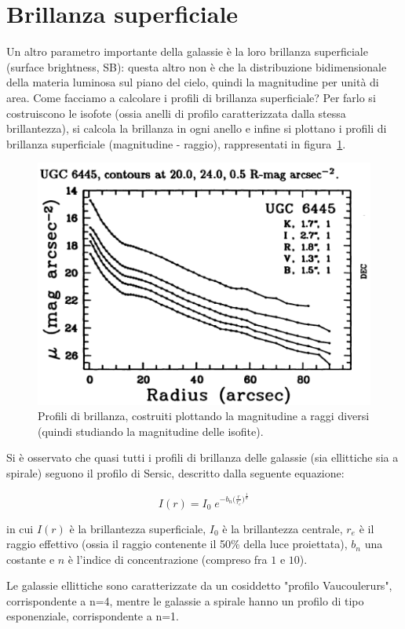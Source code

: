 \section{Brillanza superficiale}\label{sec:brillanza-superficiale}
Un altro parametro importante della galassie è la loro brillanza superficiale (surface brightness, SB): questa altro non è che la distribuzione bidimensionale della materia luminosa sul piano del cielo, quindi la magnitudine per unità di area. Come facciamo a calcolare i profili di brillanza superficiale? Per farlo si costruiscono le isofote (ossia anelli di profilo caratterizzata dalla stessa brillantezza), si calcola la brillanza in ogni anello e infine si plottano i profili di brillanza superficiale (magnitudine - raggio), rappresentati in figura~\ref{fig:profili-brillanza}.

\begin{figure}
    \centering
    \includegraphics[width = 0.5 \textwidth]{immagini/profili-di-brillanza.png}
    \caption{Profili di brillanza, costruiti plottando la magnitudine a raggi diversi (quindi studiando la magnitudine delle isofite).}
    \label{fig:profili-brillanza}
\end{figure}

Si è osservato che quasi tutti i profili di brillanza delle galassie (sia ellittiche sia a spirale) seguono il profilo di Sersic, descritto dalla seguente equazione:

\begin{equation*}
    I(r) = I_0 \; e^{-b_n \big(\frac{r}{r_e}\big)^\frac{1}{n}}
\end{equation*}

in cui $I(r)$ è la brillantezza superficiale, $I_0$ è la brillantezza centrale, $r_e$ è il raggio effettivo (ossia il raggio contenente il 50\% della luce proiettata), $b_n$ una costante e $n$ è l'indice di concentrazione (compreso fra $1$ e $10$).

Le galassie ellittiche sono caratterizzate da un cosiddetto "profilo Vaucoulerurs", corrispondente a n=4, mentre le galassie a spirale hanno un profilo di tipo esponenziale, corrispondente a n=1. 